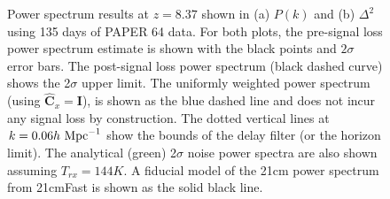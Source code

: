 \documentclass[onecolumn]{emulateapj} \shorttitle{}
\newcommand{\hMpci}{h\ {\rm Mpc}^{-1}}
\begin{document}
\begin{figure}%
    \centering
    \qquad
    \caption{Power spectrum results at $z=8.37$ shown in (a) $P(k)$ and (b) $\Delta^{2}$
             using 135 days of PAPER 64 data. For both plots, the pre-signal
             loss power spectrum estimate is shown with the black points and $2\sigma$
             error bars. The post-signal loss power spectrum (black dashed curve) shows the 2$\sigma$ upper limit.
             The uniformly weighted power spectrum (using $\widehat{\textbf{C}}_{x}=\textbf{I}$), is shown as the blue
             dashed line and does not incur any signal loss by construction.
             The dotted vertical lines at $k=0.06\hMpci$ show the bounds of the delay filter (or the horizon limit).
             The analytical (green) 2$\sigma$ noise power spectra are also shown assuming $T_{rx}=144K$. A fiducial
             model of the 21cm power spectrum from 21cmFast is shown as the solid black line.}
    \label{fig:updated_pspec}%
\end{figure}

\nocite{*}


\end{document}
